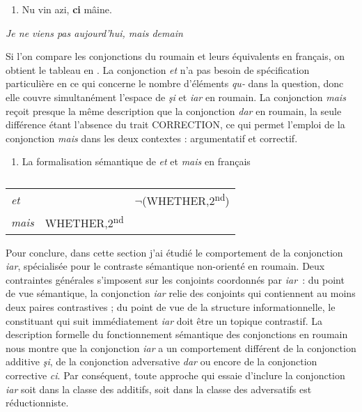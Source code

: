 \begin{enumerate}
\item Nu vin azi, \textbf{ci} mâine. 


\end{enumerate}
{\itshape
Je ne viens pas aujourd'hui, mais demain}

Si l'on compare les conjonctions du roumain et leurs équivalents en français, on obtient le tableau en . La conjonction \textit{et} n'a pas besoin de spécification particulière en ce qui concerne le nombre d'éléments \textit{qu-} dans la question, donc elle couvre simultanément l'espace de \textit{şi} et \textit{iar} en roumain. La conjonction \textit{mais} reçoit presque la même description que la conjonction \textit{dar} en roumain, la seule différence étant l'absence du trait CORRECTION, ce qui permet l'emploi de la conjonction \textit{mais} dans les deux contextes : argumentatif et correctif.  


\begin{enumerate}
\item   \label{bkm:Ref302031147}La formalisation sémantique de \textit{et} et \textit{mais} en français


\end{enumerate}

\begin{table}


\begin{tabular}{lll}

 {\itshape et}\par &  & ${\lnot}$(WHETHER,2\textsuperscript{nd})\\
 {\itshape mais}\par & WHETHER,2\textsuperscript{nd} & \\
\end{tabular}

\caption{}
\end{table}

Pour conclure, dans cette section j'ai étudié le comportement de la conjonction \textit{iar}, spécialisée pour le contraste sémantique non-orienté en roumain. Deux contraintes générales s'imposent sur les conjoints coordonnés par \textit{iar~}: du point de vue sémantique, la conjonction \textit{iar} relie des conjoints qui contiennent au moins deux paires contrastives ; du point de vue de la structure informationnelle, le constituant qui suit immédiatement \textit{iar} doit être un topique contrastif. La description formelle du fonctionnement sémantique des conjonctions en roumain nous montre que la conjonction \textit{iar} a un comportement différent de la conjonction additive \textit{şi}, de la conjonction adversative \textit{dar} ou encore de la conjonction corrective \textit{ci}. Par conséquent, toute approche qui essaie d'inclure la conjonction \textit{iar} soit dans la classe des additifs, soit dans la classe des adversatifs est réductionniste. 

